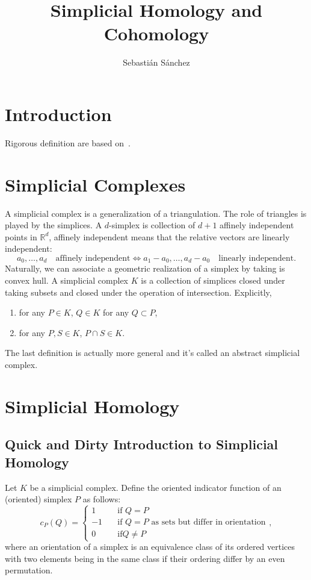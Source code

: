 \documentclass{article}
\title{Simplicial Homology and Cohomology}
\author{Sebastián Sánchez}
\date{}
\newcommand{\R}{\mathbb R}
\begin{document}
\maketitle

\section{Introduction}

Rigorous definition are based on~\cite{munkres}.

\section{Simplicial Complexes}

A simplicial complex is a generalization of a triangulation. The role of triangles is
played by the simplices. A \(d\)-simplex is collection of \(d+1\) affinely independent points
in \(\R^{d}\), affinely independent means that the relative vectors are linearly independent:
\begin{displaymath}
  a_0, \dots, a_d \quad\textrm{affinely independent}
  \iff
  a_1-a_0, \dots, a_d-a_0 \quad\textrm{linearly independent}.
\end{displaymath}
Naturally, we can associate a geometric realization of a simplex by taking is convex hull.
A simplicial complex \(K\) is a collection of simplices closed under taking subsets and 
closed under the operation of intersection. Explicitly,
\begin{enumerate}
  \item for any \(P\in K\), \(Q\in K\) for any \(Q\subset P\),
  \item for any \(P, S\in K\), \(P\cap S \in K\).
\end{enumerate}

The last definition is actually more general and it's called an abstract simplicial
complex.

\section{Simplicial Homology}

\subsection{Quick and Dirty Introduction to Simplicial Homology}

Let \(K\) be a simplicial complex. Define the oriented indicator function of an
(oriented) simplex \(P\) as follows:
\begin{displaymath}
  c_P(Q) =
  \left\{
  \begin{aligned}
    1 &\quad \textrm{if } Q=P\\
    -1 &\quad \textrm{if } Q=P\text{ as sets but differ in orientation}\\
    0 &\quad \textrm{if} Q\ne P
  \end{aligned}
  \right.,
\end{displaymath}
where an orientation of a simplex is an equivalence class of its ordered vertices
with two elements being in the same class if their ordering differ by an even
permutation.
\end{document}
